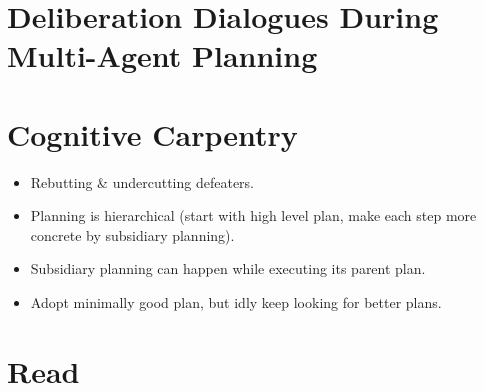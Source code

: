 \documentclass[a4paper]{article}
\begin{document}
\section{Deliberation Dialogues During Multi-Agent 
Planning\cite{dunin-keplicz2011}}

\section{Cognitive Carpentry \cite{pollock1995}}
\begin{itemize}
	\item Rebutting \& undercutting defeaters.
	\item Planning is hierarchical (start with high level plan, make each step
	more concrete by subsidiary planning).
	\item Subsidiary planning can happen while executing its parent plan.
	\item Adopt minimally good plan, but idly keep looking for better plans.
\end{itemize}

\section{Read}
\cite{atkinson2005}
\cite{dunin-keplicz2011}
\cite{prakken2006}
\cite{mcburney2007}
\cite{mcburney2009}
\cite{medellin2012}
\cite{pollock1995}
\cite{prakken2009}
\cite{silver2005}
\cite{standley2010}
\cite{bench-capon2007}
\cite{vaneemeren2014}
\cite{verheij2016}

\nocite{*}


\end{document}
